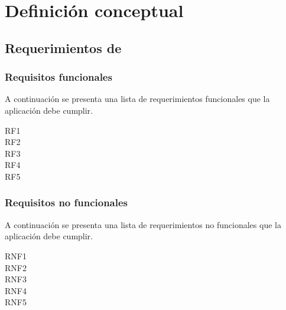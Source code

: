 \section{Definición conceptual}

\subsection{Requerimientos de }

\subsubsection*{Requisitos funcionales}
A continuación se presenta una lista de requerimientos funcionales que la aplicación debe cumplir. 


\begin{description}
\item [RF1]
\item [RF2]
\item [RF3]
\item [RF4]
\item [RF5]
\end{description}

\subsubsection*{Requisitos no funcionales}
A continuación se presenta una lista de requerimientos no funcionales que la aplicación debe cumplir. 

\begin{description}
\item [RNF1]
\item [RNF2]
\item [RNF3]
\item [RNF4]
\item [RNF5]
\end{description}